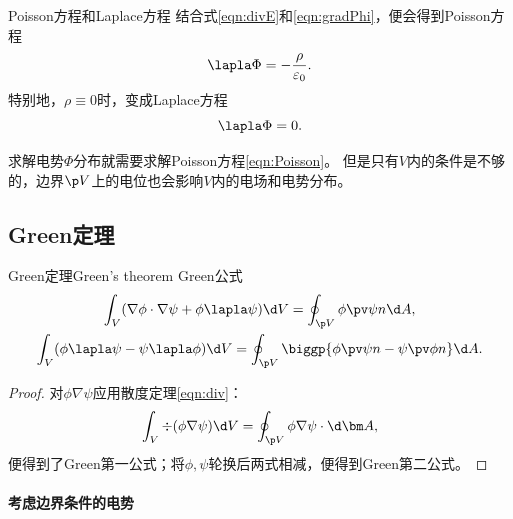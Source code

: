 \begin{definition}
    {Poisson方程和Laplace方程}{}
    结合式\eqref{eqn:divE}和\eqref{eqn:gradPhi}，便会得到Poisson方程
    \begin{equation}
        \label{eqn:Poisson}
        \lapla\Phi=-\frac\rho{\varepsilon_0}.
    \end{equation}
    特别地，$\rho\equiv 0$时，变成Laplace方程
    \begin{equation}
        \label{eqn:Laplace}
        \lapla\Phi=0.
    \end{equation}
\end{definition}
求解电势$\Phi$分布就需要求解Poisson方程\eqref{eqn:Poisson}。
但是只有$V$内的条件是不够的，边界$\p V$上的电位也会影响$V$内的电场和电势分布。

\subsection{Green定理}

\begin{theorem}{Green定理}{Green's theorem}
    Green公式
    \begin{subequations}
        \label{eqn:Green}
        \begin{gather}
            \label{eqn:Green I}
            \int_V(\nabla\phi\cdot\nabla\psi+\phi\lapla\psi)\d V=\oint_{\p V}\phi\pv\psi n\d A,\\
            \label{eqn:Green II}
            \int_V(\phi\lapla\psi-\psi\lapla\phi)\d V=\oint_{\p V}\biggp{\phi\pv\psi n-\psi\pv\phi n}\d A.
        \end{gather}
    \end{subequations}
\end{theorem}

\begin{proof}
    对$\phi\nabla\psi$应用散度定理\eqref{eqn:div}：
    \[
        \int_V\div(\phi\nabla\psi)\d V=\oint_{\p V}\phi\nabla\psi\cdot\d\bm A,
    \]
    便得到了Green第一公式；将$\phi,\psi$轮换后两式相减，便得到Green第二公式。
\end{proof}

\paragraph{考虑边界条件的电势}

